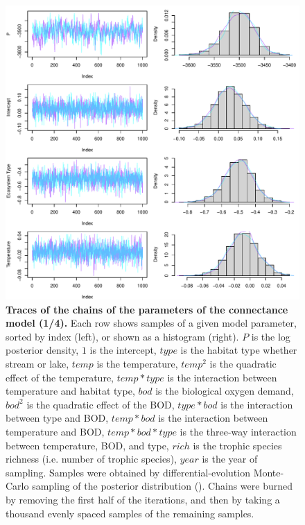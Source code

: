 \documentclass[11pt, oneside]{article}
\begin{document}
\begin{figure}[H]
\begin{center}
\includegraphics[page=1, width=1\linewidth]{scripts/b0_6_3/out_con/fig_tracePlot_beta.pdf}
\caption{
    \textbf{Traces of the chains of the parameters of the connectance model (1/4).}
    Each row shows samples of a given model parameter, sorted by index (left), or shown as a histogram (right).
    $P$ is the log posterior density, $1$ is the intercept, $type$ is the habitat type whether stream or lake, $temp$ is the temperature, $temp^2$ is the quadratic effect of the temperature, $temp * type$ is the interaction between temperature and habitat type, $bod$ is the biological oxygen demand, $bod^2$ is the quadratic effect of the BOD, $type * bod$ is the interaction between type and BOD, $temp * bod$ is the interaction between temperature and BOD, $temp * bod * type$ is the three-way interaction between temperature, BOD, and type, $rich$ is the trophic species richness (i.e. number of trophic species), $year$ is the year of sampling.
    Samples were obtained by differential-evolution Monte-Carlo sampling of the posterior distribution (\cite{TerBraak2006}).
    Chains were burned by removing the first half of the iterations, and then by taking a thousand evenly spaced samples of the remaining samples.
} 
\end{center}
\end{figure}
\end{document}
